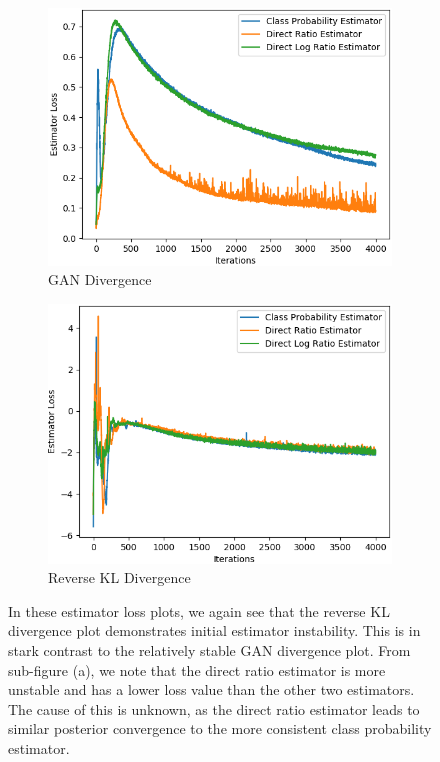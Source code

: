 \documentclass[honours,12pt, twoside]{unswthesis}
\numberwithin{equation}{section}
\theoremstyle{definition}
\begin{document}
\begin{figure}[h]
\begin{subfigure}{0.49\textwidth}
\includegraphics[width=\linewidth]{part2estimatorlosses/JCADVvsJCADVexpvsJCADVgudlog.png}
\caption{GAN Divergence}
\end{subfigure}
\begin{subfigure}{0.49\textwidth}
\includegraphics[width=\linewidth]{part2estimatorlosses/JCKLDvsJCKLexpvsJCKLgudlog.png}
\caption{Reverse KL Divergence}
\end{subfigure}
\caption{\small In these estimator loss plots, we again see that the reverse KL divergence plot demonstrates initial estimator instability. This is in stark contrast to the relatively stable GAN divergence plot. From sub-figure (a), we note that the direct ratio estimator is more unstable and has a lower loss value than the other two estimators. The cause of this is unknown, as the direct ratio estimator leads to similar posterior convergence to the more consistent class probability estimator.}
\end{figure}
\end{document}
